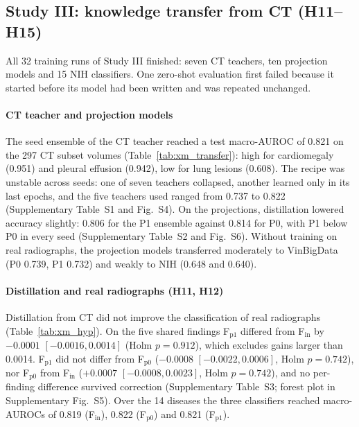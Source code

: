 \subsection{Study III: knowledge transfer from CT (H11--H15)}
\label{sec:xm_results}
All 32 training runs of Study III finished: seven CT teachers, ten projection models and 15 NIH classifiers. One zero-shot evaluation first
failed because it started before its model had been written and was repeated unchanged.

\paragraph{CT teacher and projection models} The seed ensemble of the CT teacher reached a test macro-AUROC of 0.821 on the 297 CT subset
volumes (Table~\ref{tab:xm_transfer}): high for cardiomegaly (0.951) and pleural effusion (0.942), low for lung lesions (0.608). The recipe
was unstable across seeds: one of seven teachers collapsed, another learned only in its last epochs, and the five teachers used ranged from
0.737 to 0.822 (Supplementary Table~S1 and Fig.~S4). On the projections, distillation lowered accuracy slightly: 0.806 for the P1 ensemble against
0.814 for P0, with P1 below P0 in every seed (Supplementary Table~S2 and Fig.~S6). Without training on real radiographs, the projection models
transferred moderately to VinBigData (P0 0.739, P1 0.732) and weakly to NIH (0.648 and 0.640).

\begin{table}[htbp]
\centering\small
\caption{CT teacher, projection models and zero-shot transfer: test AUROC of the seed ensembles for the six findings and their mean
(descriptive). NIH lung opacity is the approximate mapping to Infiltration.}
\label{tab:xm_transfer}
\end{table}

\paragraph{Distillation and real radiographs (H11, H12)} Distillation from CT did not improve the classification of real radiographs
(Table~\ref{tab:xm_hyp}). On the five shared findings F$_\mathrm{p1}$ differed from F$_\mathrm{in}$ by $-0.0001$ $[-0.0016, 0.0014]$
(Holm $p=0.912$), which excludes gains larger than 0.0014. F$_\mathrm{p1}$ did not differ from F$_\mathrm{p0}$ ($-0.0008$
$[-0.0022, 0.0006]$, Holm $p=0.742$), nor F$_\mathrm{p0}$ from F$_\mathrm{in}$ ($+0.0007$ $[-0.0008, 0.0023]$, Holm $p=0.742$), and no
per-finding difference survived correction (Supplementary Table~S3; forest plot in Supplementary Fig.~S5). Over the 14 diseases the three classifiers reached macro-AUROCs of
0.819 (F$_\mathrm{in}$), 0.822 (F$_\mathrm{p0}$) and 0.821 (F$_\mathrm{p1}$).

